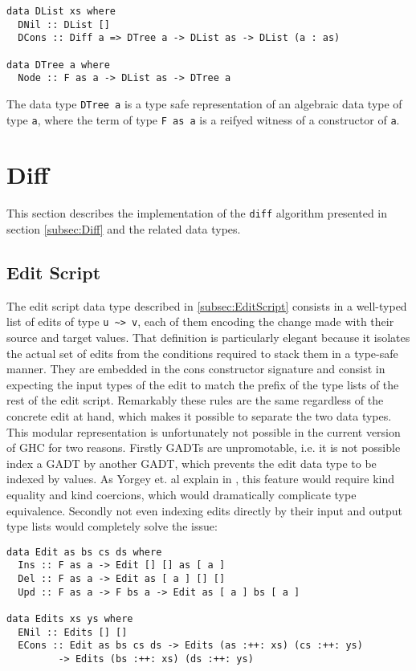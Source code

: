 \documentclass[../Thesis.tex]{subfiles}
\begin{document}
\begin{verbatim}
data DList xs where
  DNil :: DList []
  DCons :: Diff a => DTree a -> DList as -> DList (a : as)

data DTree a where
  Node :: F as a -> DList as -> DTree a
\end{verbatim}
	
	The data type \texttt{DTree a} is a type safe representation of
	an algebraic data type of type \texttt{a}, where the term
	of type \texttt{F as a} is a reifyed witness of a constructor 
	of \texttt{a}.
	
	\section{Diff}
	This section describes the implementation of the 
	\texttt{diff} algorithm presented in 	section \ref{subsec:Diff} 
	and the related data types. 
	
	\subsection{Edit Script}
	The edit script data type described in \ref{subsec:EditScript} consists in
	a well-typed list of edits of type \texttt{u \textasciitilde> v}, each of them
	encoding the change made with their source and target values.
	That definition is particularly elegant because it isolates the actual set of
	edits from the conditions required to stack them in a type-safe manner.
	They are embedded in the cons constructor signature and consist
	in expecting the input types of the edit to match the prefix of the
	type lists of the rest of the edit script.
	Remarkably these rules are the same regardless of the concrete edit 
	at hand, which makes it possible to separate the two data types.
	This modular representation is unfortunately not possible in the current
	version of GHC for two reasons. Firstly GADTs are unpromotable,  i.e. it is 
	not possible index a GADT by another GADT, which prevents the edit data 
	type	to be indexed by values.
	As Yorgey et. al explain in \cite{Yorgey12}, this feature would require kind 
	equality and kind coercions, which would  dramatically complicate type 
	equivalence.
	Secondly not even indexing edits directly by their input and output type lists
	would completely solve the issue:
	
\begin{verbatim}
data Edit as bs cs ds where
  Ins :: F as a -> Edit [] [] as [ a ] 
  Del :: F as a -> Edit as [ a ] [] [] 
  Upd :: F as a -> F bs a -> Edit as [ a ] bs [ a ] 

data Edits xs ys where
  ENil :: Edits [] [] 
  ECons :: Edit as bs cs ds -> Edits (as :++: xs) (cs :++: ys) 
         -> Edits (bs :++: xs) (ds :++: ys) 
\end{verbatim}
	
\end{document}
